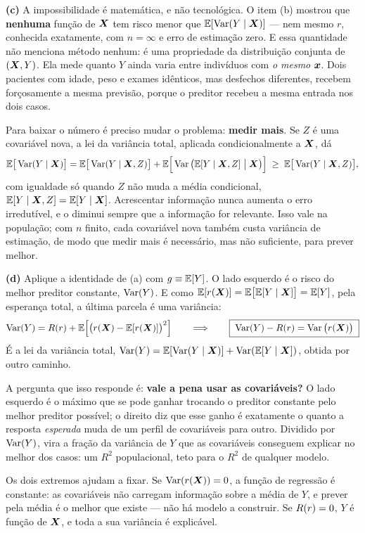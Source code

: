 \begin{solucao}
\smallskip
\textbf{(c)} A impossibilidade é matemática, e não tecnológica. O item (b) mostrou que
\textbf{nenhuma} função de $\bm{X}$ tem risco menor que $\mathbb{E}[\operatorname{Var}(Y\mid\bm{X})]$ --- nem mesmo
$r$, conhecida exatamente, com $n=\infty$ e erro de estimação zero. E essa quantidade
não menciona método nenhum: é uma propriedade da distribuição conjunta de $(\bm{X},Y)$.
Ela mede quanto $Y$ ainda varia entre indivíduos com \emph{o mesmo} $\bm{x}$. Dois
pacientes com idade, peso e exames idênticos, mas desfechos diferentes, recebem
forçosamente a mesma previsão, porque o preditor recebeu a mesma entrada nos dois
casos.

Para baixar o número é preciso mudar o problema: \textbf{medir mais}. Se $Z$ é uma
covariável nova, a lei da variância total, aplicada condicionalmente a $\bm{X}$, dá
\[
  \mathbb{E}\big[\operatorname{Var}(Y\mid\bm{X})\big]
  = \mathbb{E}\big[\operatorname{Var}(Y\mid\bm{X},Z)\big]
    + \mathbb{E}\Big[\operatorname{Var}\big(\mathbb{E}[Y\mid\bm{X},Z]\;\big|\;\bm{X}\big)\Big]
  \;\ge\; \mathbb{E}\big[\operatorname{Var}(Y\mid\bm{X},Z)\big],
\]
com igualdade só quando $Z$ não muda a média condicional, $\mathbb{E}[Y\mid\bm{X},Z]=\mathbb{E}[Y\mid\bm{X}]$.
Acrescentar informação nunca aumenta o erro irredutível, e o diminui sempre que a
informação for relevante. Isso vale na população; com $n$ finito, cada covariável
nova também custa variância de estimação, de modo que medir mais é
necessário, mas não suficiente, para prever melhor.

\smallskip
\textbf{(d)} Aplique a identidade de (a) com $g\equiv\mathbb{E}[Y]$. O lado esquerdo é o risco
do melhor preditor constante, $\operatorname{Var}(Y)$. E como $\mathbb{E}[r(\bm{X})]=\mathbb{E}\big[\mathbb{E}[Y\mid\bm{X}]\big]=\mathbb{E}[Y]$,
pela esperança total, a última parcela é uma variância:
\[
  \operatorname{Var}(Y) = R(r) + \mathbb{E}\Big[\big(r(\bm{X})-\mathbb{E}[r(\bm{X})]\big)^2\Big]
  \qquad\Longrightarrow\qquad
  \boxed{\;\operatorname{Var}(Y)-R(r)=\operatorname{Var}\big(r(\bm{X})\big)\;}
\]
É a lei da variância total, $\operatorname{Var}(Y)=\mathbb{E}[\operatorname{Var}(Y\mid\bm{X})]+\operatorname{Var}(\mathbb{E}[Y\mid\bm{X}])$, obtida por
outro caminho.

A pergunta que isso responde é: \textbf{vale a pena usar as covariáveis?} O lado
esquerdo é o máximo que se pode ganhar trocando o preditor constante pelo melhor
preditor possível; o direito diz que esse ganho é exatamente o quanto a resposta
\emph{esperada} muda de um perfil de covariáveis para outro. Dividido por $\operatorname{Var}(Y)$,
vira a fração da variância de $Y$ que as covariáveis conseguem explicar no melhor dos
casos: um $R^2$ populacional, teto para o $R^2$ de qualquer modelo.

Os dois extremos ajudam a fixar. Se $\operatorname{Var}(r(\bm{X}))=0$, a função de regressão é
constante: as covariáveis não carregam informação sobre a média de $Y$, e prever pela
média é o melhor que existe --- não há modelo a construir. Se $R(r)=0$, $Y$ é
função de $\bm{X}$, e toda a sua variância é explicável.
\end{solucao}
